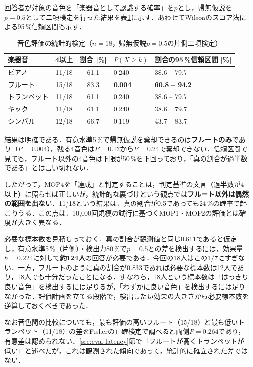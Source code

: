 \documentclass[uplatex,dvipdfmx]{jlreq}
\begin{document}
回答者が対象の音色を「楽器音として認識する確率」を$p$とし，帰無仮説を$p=0.5$として二項検定を行った結果を表\ref{tab:tone-stat}に示す．あわせてWilsonのスコア法による95\,\%信頼区間も示す．

\begin{table}[tb]
\caption{音色評価の統計的検定（$n=18$，帰無仮説$p=0.5$の片側二項検定）}
\label{tab:tone-stat}
\begin{center}
\small
\begin{tabular}{lccll}
\hline
楽器音 & 4以上 & 割合 [\%] & $P(X \geq k)$ & 割合の95\,\%信頼区間 [\%] \\
\hline
ピアノ & 11/18 & 61.1 & 0.240 & 38.6 -- 79.7 \\
フルート & 15/18 & 83.3 & \textbf{0.004} & \textbf{60.8 -- 94.2} \\
トランペット & 11/18 & 61.1 & 0.240 & 38.6 -- 79.7 \\
キック & 11/18 & 61.1 & 0.240 & 38.6 -- 79.7 \\
シンバル & 12/18 & 66.7 & 0.119 & 43.7 -- 83.7 \\
\hline
\end{tabular}
\end{center}
\end{table}

結果は明確である．有意水準5\,\%で帰無仮説を棄却できるのは\textbf{フルートのみ}であり（$P=0.004$），残る4音色は$P=0.12$から$P=0.24$で棄却できない．信頼区間で見ても，フルート以外の4音色は下限が50\,\%を下回っており，「真の割合が過半数である」とは言い切れない．

したがって，MOP4を「達成」と判定することは，判定基準の文言（過半数が4以上）に照らせば正しいが，統計的な裏づけという観点では\textbf{フルート以外は偶然の範囲を出ない}．11/18という結果は，真の割合が0.5であっても24\,\%の確率で起こりうる．この点は，10{,}000回規模の試行に基づくMOP1・MOP2の評価とは確度が大きく異なる．

必要な標本数を見積もっておく．真の割合が観測値と同じ0.611であると仮定し，有意水準5\,\%（片側）・検出力80\,\%で$p=0.5$との差を検出するには，効果量$h=0.224$に対して\textbf{約124人}の回答が必要である．今回の18人はこの1/7にすぎない．一方，フルートのように真の割合が0.833であれば必要な標本数は12人であり，18人でも十分だったことになる．すなわち，18人という標本数は「はっきり良い音色」を検出するには足りるが，「わずかに良い音色」を検出するには足りなかった．評価計画を立てる段階で，検出したい効果の大きさから必要標本数を逆算しておくべきであった．

なお音色間の比較についても，最も評価の高いフルート（15/18）と最も低いトランペット（11/18）の差をFisherの正確検定で調べると両側$P=0.264$であり，有意差は認められない．\ref{sec:eval-latency}節で「フルートが高くトランペットが低い」と述べたが，これは観測された傾向であって，統計的に確立された差ではない．
\end{document}
